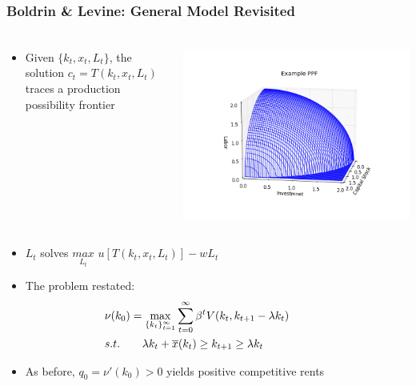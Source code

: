 \documentclass{beamer}
\begin{document}
\begin{frame}[t]\frametitle{Boldrin \& Levine: General Model Revisited}
  \frametitle{}
    \begin{columns}[T]
      \begin{column}{.4\textwidth}
        \begin{block}{}
        \begin{itemize}
          \item<+-> Given $\{k_t, x_t, L_t\}$, the solution $c_t = T(k_t,x_t,L_t)$ traces a production possibility frontier\\
      \end{itemize}
      \end{block}
    \end{column}
    \begin{column}{.6\textwidth}
      \begin{block}{}
        \begin{center}
          \includegraphics[scale=.25]{example_ppf_wire.png}
          \label{fig:ppf}
        \end{center}
      \end{block}
    \end{column}
  \end{columns}

  \begin{itemize}
    \item<+-> $L_t$ solves $\underset{L_t}{max}$ $u[T(k_t,x_t,L_t)]-wL_t$
    \item<+-> The problem restated:
      \begin{align*}
        &\nu(k_0)=
        \max_{\{k_t\}_{t=1}^\infty} \sum_{t=0}^\infty\beta^tV(k_t,k_{t+1} - \lambda k_t)
          \hspace{13mm}\\
        &s.t. \ \ \ \ \ \ \lambda k_t + \overline{x}(k_t) \ge k_{t+1} \ge \lambda k_t
      \end{align*}
  \item<+-> As before, $q_0 = \nu ' (k_0) > 0$ yields positive competitive rents
  \end{itemize}

\end{frame}
\end{document}

